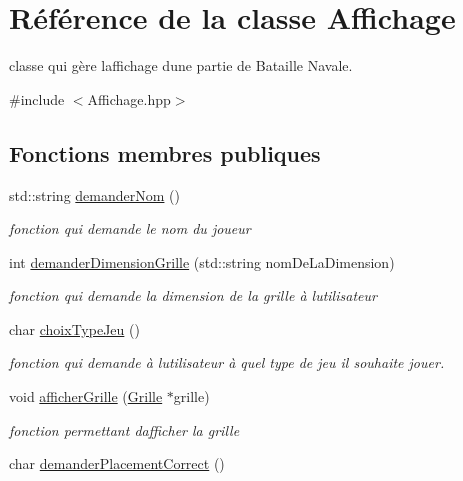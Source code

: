 \hypertarget{class_affichage}{}\section{Référence de la classe Affichage}
\label{class_affichage}


classe qui gère l\textquotesingle{}affichage d\textquotesingle{}une partie de Bataille Navale.  




{\ttfamily \#include $<$Affichage.\+hpp$>$}

\subsection*{Fonctions membres publiques}
\begin{DoxyCompactItemize}
\item 
std\+::string \hyperlink{class_affichage_a38a16337c9e9df4057d85462c874c1a8}{demander\+Nom} ()
\begin{DoxyCompactList}\small\item\em fonction qui demande le nom du joueur \end{DoxyCompactList}\item 
int \hyperlink{class_affichage_a37398da67f8420b766f2a0cc92c1396c}{demander\+Dimension\+Grille} (std\+::string nom\+De\+La\+Dimension)
\begin{DoxyCompactList}\small\item\em fonction qui demande la dimension de la grille à l\textquotesingle{}utilisateur \end{DoxyCompactList}\item 
char \hyperlink{class_affichage_a3a02104019c31b0ce350daa544e9e776}{choix\+Type\+Jeu} ()
\begin{DoxyCompactList}\small\item\em fonction qui demande à l\textquotesingle{}utilisateur à quel type de jeu il souhaite jouer. \end{DoxyCompactList}\item 
void \hyperlink{class_affichage_a8ae9b8381b263ba591172a0cf18c9ca1}{afficher\+Grille} (\hyperlink{class_grille}{Grille} $\ast$grille)
\begin{DoxyCompactList}\small\item\em fonction permettant d\textquotesingle{}afficher la grille \end{DoxyCompactList}\item 
char \hyperlink{class_affichage_a22b1ff3a190a1043e4c9cfe2eec23404}{demander\+Placement\+Correct} ()

\end{DoxyCompactItemize}
